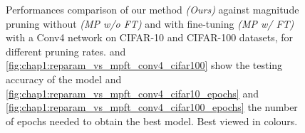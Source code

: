\begin{figure}
  \caption{ Performances comparison of our method {\em(Ours)} against
  magnitude pruning without {\em(MP w/o FT)} and with fine-tuning {\em(MP w/ FT)} with a Conv4 network on
  CIFAR-10 and CIFAR-100 datasets, for different pruning rates.
   and
  \cref{fig:chap1:reparam_vs_mpft_conv4_cifar100} show the testing accuracy of
  the model and \cref{fig:chap1:reparam_vs_mpft_conv4_cifar10_epochs} and
  \cref{fig:chap1:reparam_vs_mpft_conv4_cifar100_epochs} the number of epochs
  needed to obtain the best model. Best viewed in colours.}
  \label{fig:chap1:reparam_vs_mpft_conv4}
\end{figure}

\begin{figure}
  \centering
  \\

\end{figure}
